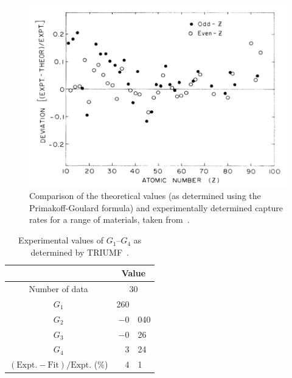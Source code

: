 \begin{figure}[hptb]
  \centering
    \includegraphics[width=.9\textwidth]{images/primakoff-goulard_vs_exp.png}
  \caption{Comparison of the theoretical values (as determined using the Primakoff-Goulard formula) and experimentally determined capture rates for a range of materials, taken from~\cite{suzuki_mu_capture_rates}.}
  \label{fig:primakoff-goulard_vs_exp}
\end{figure}

\begin{table}
  \begin{center}
  \begin{tabular}{c | r@{.}l }
                                                              & \multicolumn{2}{c}{Value} \\
    \hline
    Number of data                                            & \multicolumn{2}{c}{30}                 \\
    \hline
    \( G_1 \)                                                 &             260 &                       \\
    \( G_2 \)                                                 &          \(-0\) & 040                   \\
    \( G_3 \)                                                 &          \(-0\) & 26                    \\
    \( G_4 \)                                                 &               3 & 24                    \\
    \hline
    \( (\textrm{Expt.} - \textrm{Fit})/\textrm{Expt.} \) (\%) &               4 & 1                     \\
  \end{tabular}
  \end{center}
  \caption{Experimental values of \( G_1 \)--\( G_4 \) as determined by TRIUMF~\cite{suzuki_mu_capture_rates}.}
  \label{tab:g1_to_g4}
\end{table}


